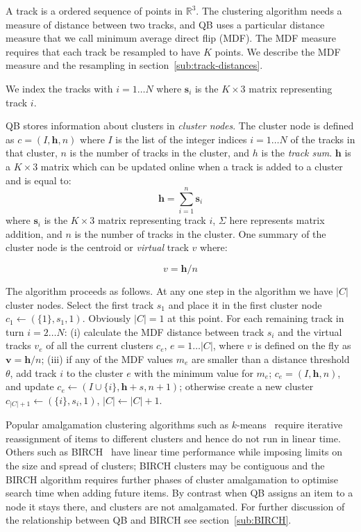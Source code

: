 \documentclass[preprint,authoryear,a4paper,10pt,onecolumn]{elsarticle}
\begin{document}
A track is a ordered sequence of points in $\mathbb{R}^{3}$.  The clustering
algorithm needs a measure of distance between two tracks, and QB uses a
particular distance measure that we call minimum average direct flip (MDF).  The
MDF measure requires that each track be resampled to have $K$ points. We
describe the MDF measure and the resampling in
section~\ref{sub:track-distances}.

We index the tracks with $i = 1 \dots N$ where $\mathbf{s}_{i}$ is the
$K\times3$ matrix representing track $i$.

QB stores information about clusters in \emph{cluster nodes}.  The cluster node
is defined as $c=(I,\mathbf{h},n)$ where $I$ is the list of the integer
indices $i = 1 \dots N$ of the tracks in that cluster, $n$ is the number of
tracks in the cluster, and $h$ is the \emph{track sum}. $\mathbf{h}$ is a $K
\times3$ matrix which can be updated online when a track is added to a cluster
and is equal to:
\begin{equation}
  \mathbf{h}=\sum_{i=1}^{n}\mathbf{s}_{i}
\end{equation} 
where $\mathbf{s}_{i}$ is the $K\times3$ matrix representing track $i$,
$\Sigma$ here represents matrix addition, and $n$ is the number of
tracks in the cluster. One summary of the cluster node is the centroid or
\emph{virtual} track $v$ where:

\begin{equation}
  v = \mathbf{h} / n
\end{equation}

The algorithm proceeds as follows.  At any one step in the algorithm we
have $|C|$ cluster nodes. Select the first track $s_{1}$ and place it in
the first cluster node $c_{1}\leftarrow(\{1\},s_{1},1)$.  Obviously $|C|
= 1$ at this point.  For each remaining track in turn $i = 2 \dots N$: (i)
calculate the MDF distance between track $s_{i}$ and the virtual tracks
$v_{e}$ of all the current clusters $c_{e}$, $e = 1 \dots |C|$, where
$v$ is defined on the fly as $\mathbf{v}=\mathbf{h}/n$; (iii) if any of
the MDF values $m_{e}$ are smaller than a distance threshold $\theta$,
add track $i$ to the cluster $e$ with the minimum value for $m_{e}$;
$c_{e}=(I,\mathbf{h},n)$, and update
$c_{e}\leftarrow(I\cup\{i\},\mathbf{h}+s,n+1)$; otherwise create a new
cluster $c_{|C|+1}\leftarrow(\{i\},s_{i},1)$, $|C|\leftarrow|C|+1$.

Popular amalgamation clustering algorithms such as
$k$-means~\citep{steinhaus1956division, macqueen1967some} require
iterative reassignment of items to different clusters and hence do not
run in linear time. Others such as BIRCH~\citep{zhang1997birch} have
linear time performance while imposing limits on the size and spread of
clusters; BIRCH clusters may be contiguous and the BIRCH algorithm
requires further phases of cluster amalgamation to optimise search time
when adding future items. By contrast when QB assigns an item to a node
it stays there, and clusters are not amalgamated.  For further
discussion of the relationship between QB and BIRCH see
section~\ref{sub:BIRCH}.
\end{document}
